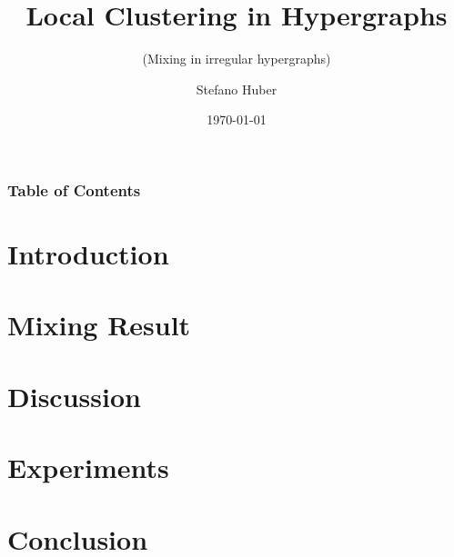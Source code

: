 \documentclass{beamer}
\title[Clustering in Hypergraphs]{Local Clustering in Hypergraphs}
\subtitle{(Mixing in irregular hypergraphs)}
\author[Stefano Huber]{
	Stefano Huber
}
\institute[]{Department of Computer Science \\EPFL}
\date{\today}
\begin{document}
\begin{frame}
\maketitle
\end{frame}



\begin{frame}
\frametitle{Table of Contents}
\tableofcontents
\end{frame}


\section{Introduction}


\section{Mixing Result}


\section{Discussion}


\section{Experiments}


\section{Conclusion}

\end{document}
